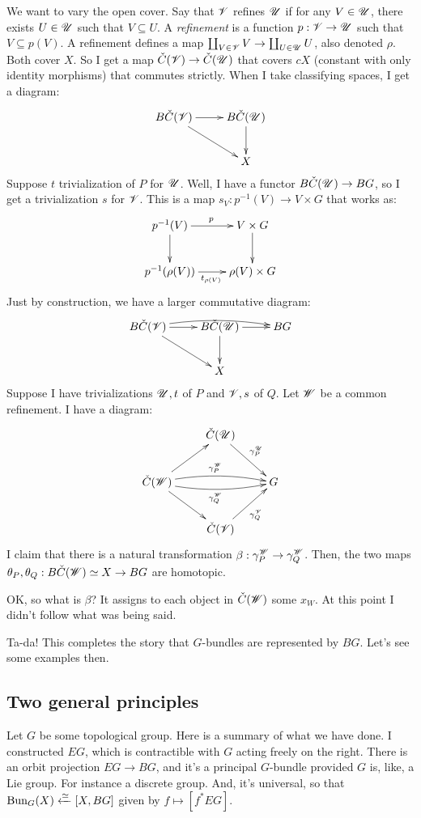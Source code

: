 We want to vary the open cover.
Say that $\mathscr V$ refines $\mathscr U$ if for any $V\in \mathscr U$, there exists $U\in\mathscr U$ such that $V\subseteq U$.
A \emph{refinement} is a function $p:\mathscr V\to\mathscr U$ such that $V\subseteq p(V)$.
A refinement defines a map $\coprod_{V\in \mathscr V} V\to \coprod_{U\in\mathscr U} U$, also denoted $\rho$.
Both cover $X$.
So I get a map $\check{C}(\mathscr V)\to \check{C}(\mathscr U)$ that covers $cX$ (constant with only identity morphisms) that commutes strictly.
When I take classifying spaces, I get a diagram:
$$
\xymatrix{
    B\cCC(\cV)\ar[r]\ar[dr] & B\cCC(\cU)\ar[d]\\
    & X
}
$$
Suppose $t$ trivialization of $P$ for $\mathscr U$.
Well, I have a functor $B\check{C}(\mathscr U)\to BG$, so I get a trivialization $s$ for $\mathscr V$.
This is a map $s_V:p^{-1}(V)\to V\times G$ that works as:
\begin{equation*}
    \xymatrix{
	p^{-1}(V)\ar[r]^p\ar[d] & V\times G\ar[d]\\
	p^{-1}(\rho(V))\ar[r]_{t_{\rho(V)}} & \rho(V)\times G
    }
\end{equation*}
Just by construction, we have a larger commutative diagram:
\begin{equation*}
\xymatrix{
    B\cCC(\cV)\ar[r]\ar[dr]\ar@/^/[rr] & B\cCC(\cU)\ar[d]\ar[r] & BG\\
    & X
}
\end{equation*}
Suppose I have trivializations $\mathscr U, t$ of $P$ and $\mathscr V, s$ of $Q$.
Let $\mathscr W$ be a common refinement.
I have a diagram:
\begin{equation*}
    \xymatrix{
	& \cCC(\cU)\ar[dr]^{\gamma^\cU_{P}} & \\
	\cCC(\cW)\ar[ur]\ar[dr]\ar@/^/[rr]^{\gamma^\cW_P}\ar@/_/[rr]_{\gamma^\cW_Q} & & G\\
	& \cCC(\cV)\ar[ur]_{\gamma^\cV_Q}
    }
\end{equation*}
I claim that there is a natural transformation $\beta:\gamma^\mathscr W_P\to \gamma^\mathscr W_Q$.
Then, the two maps $\theta_P,\theta_Q:B\check{C}(\mathscr W)\simeq X\to BG$ are homotopic.

OK, so what is $\beta$? It assigns to each object in $\check{C}(\mathscr W)$ some $x_W$.
At this point I didn't follow what was being said.

Ta-da!
This completes the story that $G$-bundles are represented by $BG$.
Let's see some examples then.
\subsection{Two general principles}
Let $G$ be some topological group.
Here is a summary of what we have done.
I constructed $EG$, which is contractible with $G$ acting freely on the right.
There is an orbit projection $EG\to BG$, and it's a principal $G$-bundle provided $G$ is, like, a Lie group.
For instance a discrete group.
And, it's universal, so that $\mathrm{Bun}_G(X)\xleftarrow{\simeq} [X, BG]$ given by $f\mapsto [f^\ast EG]$.


